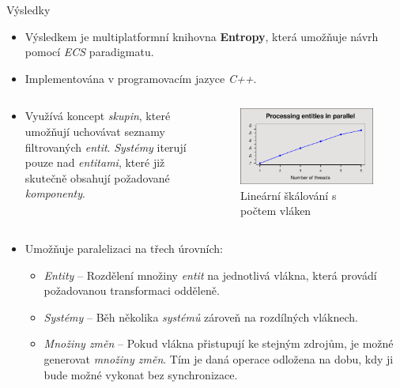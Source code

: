 \documentclass[final,hyperref={pdfpagelabels=false}]{beamer}
\begin{document}
\begin{frame}[t, fragile]
\begin{columns}[t]
\begin{column}{.465\textwidth}
\begin{block}{Výsledky}
\begin{itemize}
	\item Výsledkem je multiplatformní knihovna \textbf{Entropy}, která umožňuje návrh pomocí \emph{ECS} paradigmatu.
	\item Implementována v programovacím jazyce \emph{C++}.
\end{itemize}
\begin{columns}
	\begin{column}{0.6\linewidth}
		\vspace{-3em}
		\begin{itemize}
		\item Využívá koncept \emph{skupin}, které umožňují uchovávat seznamy filtrovaných \emph{entit}. \emph{Systémy} iterují pouze nad \emph{entitami}, které již skutečně obsahují požadované \emph{komponenty}.
		\end{itemize}
	\end{column}
	\begin{column}{0.29\linewidth}
		\vspace{-2em}
		\begin{figure}
			\hspace{-4em}
			\includegraphics[scale=0.2]{poster0.pdf}
			\caption{\hspace{-6em} Lineární škálování s počtem vláken}
		\end{figure}
	\end{column}
\end{columns}
\vspace{-1em}
\begin{itemize}
	\item Umožňuje paralelizaci na třech úrovních:
	\begin{itemize}
		\item \emph{Entity} -- Rozdělení množiny \emph{entit} na jednotlivá vlákna, která provádí požadovanou transformaci odděleně.
		\item \emph{Systémy} -- Běh několika \emph{systémů} zároveň na rozdílných vláknech.
		\item \emph{Množiny změn} -- Pokud vlákna přistupují ke stejným zdrojům, je možné generovat \emph{množiny změn}. Tím je daná operace odložena na dobu, kdy ji bude možné vykonat bez synchronizace.
	\end{itemize}
\end{itemize}


\end{block}
\end{column}
\end{columns}
\end{frame}
\end{document}
